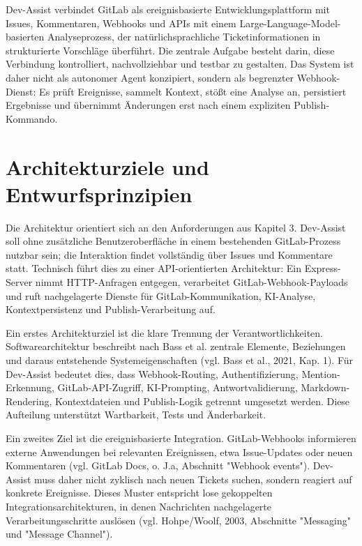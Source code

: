 \documentclass[12pt,a4paper,oneside]{scrreprt}
\begin{document}
Dev-Assist verbindet GitLab als ereignisbasierte Entwicklungsplattform mit Issues, Kommentaren, Webhooks und APIs mit einem Large-Language-Model-basierten Analyseprozess, der natürlichsprachliche Ticketinformationen in strukturierte Vorschläge überführt. Die zentrale Aufgabe besteht darin, diese Verbindung kontrolliert, nachvollziehbar und testbar zu gestalten. Das System ist daher nicht als autonomer Agent konzipiert, sondern als begrenzter Webhook-Dienst: Es prüft Ereignisse, sammelt Kontext, stößt eine Analyse an, persistiert Ergebnisse und übernimmt Änderungen erst nach einem expliziten Publish-Kommando.

\section{Architekturziele und Entwurfsprinzipien}

Die Architektur orientiert sich an den Anforderungen aus Kapitel 3. Dev-Assist soll ohne zusätzliche Benutzeroberfläche in einem bestehenden GitLab-Prozess nutzbar sein; die Interaktion findet vollständig über Issues und Kommentare statt. Technisch führt dies zu einer API-orientierten Architektur: Ein Express-Server nimmt HTTP-Anfragen entgegen, verarbeitet GitLab-Webhook-Payloads und ruft nachgelagerte Dienste für GitLab-Kommunikation, KI-Analyse, Kontextpersistenz und Publish-Verarbeitung auf.

Ein erstes Architekturziel ist die klare Trennung der Verantwortlichkeiten. Softwarearchitektur beschreibt nach Bass et al. zentrale Elemente, Beziehungen und daraus entstehende Systemeigenschaften (vgl. Bass et al., 2021, Kap. 1). Für Dev-Assist bedeutet dies, dass Webhook-Routing, Authentifizierung, Mention-Erkennung, GitLab-API-Zugriff, KI-Prompting, Antwortvalidierung, Markdown-Rendering, Kontextdateien und Publish-Logik getrennt umgesetzt werden. Diese Aufteilung unterstützt Wartbarkeit, Tests und Änderbarkeit.

Ein zweites Ziel ist die ereignisbasierte Integration. GitLab-Webhooks informieren externe Anwendungen bei relevanten Ereignissen, etwa Issue-Updates oder neuen Kommentaren (vgl. GitLab Docs, o. J.a, Abschnitt "Webhook events"). Dev-Assist muss daher nicht zyklisch nach neuen Tickets suchen, sondern reagiert auf konkrete Ereignisse. Dieses Muster entspricht lose gekoppelten Integrationsarchitekturen, in denen Nachrichten nachgelagerte Verarbeitungsschritte auslösen (vgl. Hohpe/Woolf, 2003, Abschnitte "Messaging" und "Message Channel").
\end{document}
